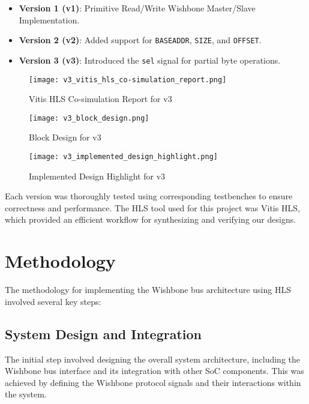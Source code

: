 \documentclass[12pt]{report}
\begin{document}
\begin{itemize}
    \item \textbf{Version 1 (v1)}: Primitive Read/Write Wishbone Master/Slave Implementation.
    \item \textbf{Version 2 (v2)}: Added support for \texttt{BASEADDR}, \texttt{SIZE}, and \texttt{OFFSET}.
    \item \textbf{Version 3 (v3)}: Introduced the \texttt{sel} signal for partial byte operations.
\end{itemize}

\begin{figure}[H]
    \centering
    \texttt{[image: v3\_vitis\_hls\_co-simulation\_report.png]}
    \caption{Vitis HLS Co-simulation Report for v3}
    \label{fig:v3_vitis_hls_co-simulation_report}
\end{figure}

\begin{figure}[H]
    \centering
    \texttt{[image: v3\_block\_design.png]}
    \caption{Block Design for v3}
    \label{fig:v3_block_design}
\end{figure}

\begin{figure}[H]
    \centering
    \texttt{[image: v3\_implemented\_design\_highlight.png]}
    \caption{Implemented Design Highlight for v3}
    \label{fig:v3_implemented_design_highlight}
\end{figure}

Each version was thoroughly tested using corresponding testbenches to ensure correctness and performance. The HLS tool used for this project was Vitis HLS, which provided an efficient workflow for synthesizing and verifying our designs.





\section{Methodology}

The methodology for implementing the Wishbone bus architecture using HLS involved several key steps:

\subsection{System Design and Integration}
The initial step involved designing the overall system architecture, including the Wishbone bus interface and its integration with other SoC components. This was achieved by defining the Wishbone protocol signals and their interactions within the system.
\end{document}
